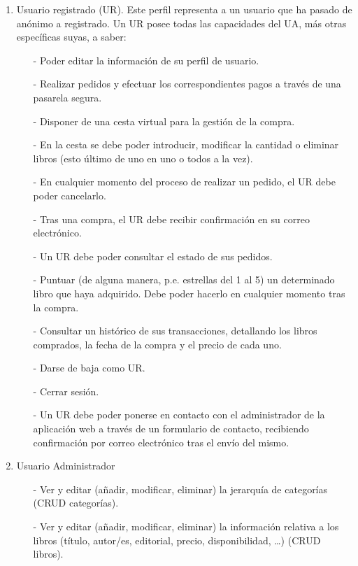 \documentclass[a4paper]{article}
\begin{document}
\begin{enumerate}
                \item Usuario registrado (UR). Este perfil representa a un usuario que ha pasado de anónimo a registrado. Un UR posee todas las capacidades del UA, más otras específicas suyas, a saber:
                \begin{itemize}
                    \item[-] Poder editar la información de su perfil de usuario.
                    \item[-] Realizar pedidos y efectuar los correspondientes pagos a través de una pasarela segura.
                    \item[-] Disponer de una cesta virtual para la gestión de la compra.
                    \item[-] En la cesta se debe poder introducir, modificar la cantidad o eliminar libros (esto último de uno en uno o todos a la vez).
                    \item[-] En cualquier momento del proceso de realizar un pedido, el UR debe poder cancelarlo.
                    \item[-] Tras una compra, el UR debe recibir confirmación en su correo electrónico.
                    \item[-] Un UR debe poder consultar el estado de sus pedidos.
                    \item[-] Puntuar (de alguna manera, p.e. estrellas del 1 al 5) un determinado libro que haya adquirido. Debe poder hacerlo en cualquier momento tras la compra.
                    \item[-] Consultar un histórico de sus transacciones, detallando los libros comprados, la fecha de la compra y el precio de cada uno.
                    \item[-] Darse de baja como UR.
                    \item[-] Cerrar sesión.
                    \item[-] Un UR debe poder ponerse en contacto con el administrador de la aplicación web a través de un formulario de contacto, recibiendo confirmación por correo electrónico tras el envío del mismo.
                \end{itemize}
                \item Usuario Administrador
                \begin{itemize}
                    \item[-] Ver y editar (añadir, modificar, eliminar) la jerarquía de categorías (CRUD categorías).
                    \item[-] Ver y editar (añadir, modificar, eliminar) la información relativa a los libros (título, autor/es, editorial, precio, disponibilidad, \ldots) (CRUD libros).

\end{itemize}
\end{enumerate}
\end{document}
